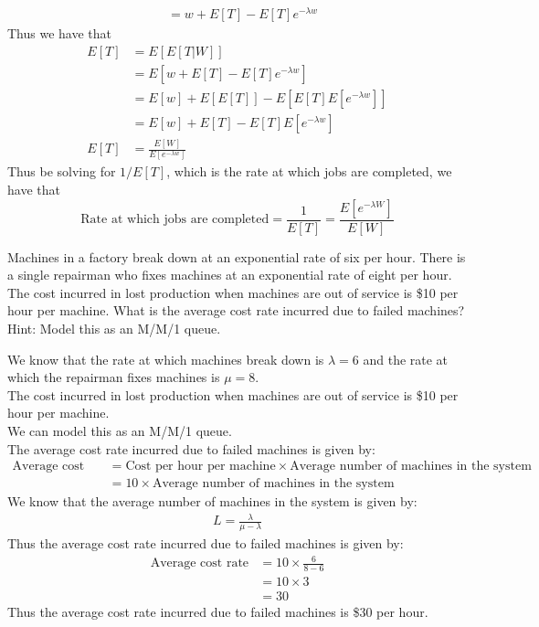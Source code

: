 \documentclass[answers,12pt,addpoints]{exam}
\begin{document}
\begin{questions}
\begin{solution}
\begin{align*}
            &= w + E[T] - E[T] e^{-\lambda w} 
        \end{align*}
        Thus we have that
        \begin{align*}
            E[T] &= E[E[T | W]]\\
            &= E[w + E[T] - E[T] e^{-\lambda w}]\\
            &= E[w] + E[E[T]] - E[E[T] E[e^{-\lambda w}]]\\
            &= E[w] + E[T] - E[T] E[e^{-\lambda w}]\\
            E[T] &= \frac{E[W]}{E[e^{-\lambda w}]}
        \end{align*}
        Thus be solving for $1/ E[T]$, which is the rate at which jobs are completed, we have that
        $$ \text{Rate at which jobs are completed} = \frac{1}{E[T]} = \frac{E[e^{-\lambda W}]}{E[W]}$$

        

    
    \end{solution}

    Machines in a factory break down at an exponential rate of six per hour. There is a single repairman
    who fixes machines at an exponential rate of eight per hour. The cost incurred in lost production
    when machines are out of service is \$10 per hour per machine. What is the average cost rate
    incurred due to failed machines?\\
    Hint: Model this as an M/M/1 queue.
    \begin{solution}
        We know that the rate at which machines break down is $\lambda = 6$ and the rate at which the repairman fixes machines is $\mu = 8$.\\
        The cost incurred in lost production when machines are out of service is \$10 per hour per machine.\\
        We can model this as an M/M/1 queue.\\
        The average cost rate incurred due to failed machines is given by:
        \begin{align*}
            \text{Average cost rate} &= \text{Cost per hour per machine} \times \text{Average number of machines in the system}\\
            &= 10 \times \text{Average number of machines in the system}
        \end{align*}
        We know that the average number of machines in the system is given by:
        \begin{align*}
            L = \frac{\lambda}{\mu - \lambda}
        \end{align*}
        Thus the average cost rate incurred due to failed machines is given by:
        \begin{align*}
            \text{Average cost rate} &= 10 \times \frac{6}{8 - 6}\\
            &= 10 \times 3\\
            &= 30
        \end{align*}
        Thus the average cost rate incurred due to failed machines is \$30 per hour.
    \end{solution}


\end{questions}
\end{document}
